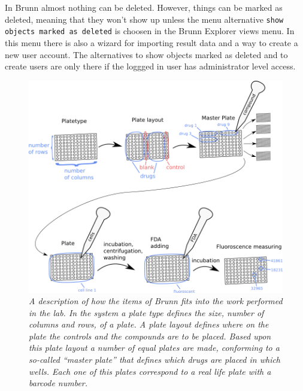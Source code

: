 \documentclass[a4paper,10pt]{article}
\begin{document}
            In Brunn almost nothing can be deleted. However, things can be
            marked as deleted, meaning that they won't show up unless the menu
            alternative \texttt{show objects marked as deleted} is choosen in
            the Brunn Explorer views menu. In this menu there is also a wizard
            for importing result data and a way to create a new user account.
            The alternatives to show objects marked as deleted and to create
            users are only there if the loggged in user has administrator
            level access.
        
        \begin{figure}[htbp]
            \begin{center}
                \includegraphics[width=1\textwidth]{images/labWork.png}
            \end{center}
            \caption{\textit{A description of how the items of Brunn fits into
                             the work performed in the lab. In the system a
                             plate type defines the size, number of columns and
                             rows, of a plate. A plate layout defines where on
                             the plate the controls and the compounds are to be
                             placed. Based upon this plate layout a number of
                             equal plates are made, conforming to a so-called
                             “master plate” that defines which drugs are placed
                             in which wells. Each one of this plates correspond
                             to a real life plate with a barcode number. }}
            \label{labWork}
        \end{figure}
\end{document}
